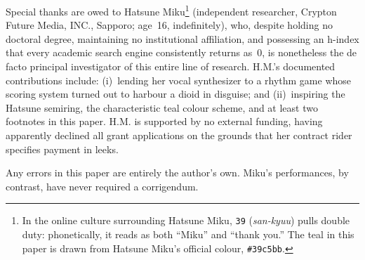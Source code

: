 \documentclass[11pt, letterpaper]{article}
\theoremstyle{definition}
\theoremstyle{remark}
\begin{document}
Special thanks are owed to Hatsune Miku\footnote{%
  In the online culture surrounding Hatsune Miku, \texttt{39} (\textit{san-kyuu}) pulls double duty: phonetically, it reads as both ``Miku'' and ``thank you.'' The teal in this paper is drawn from Hatsune Miku's official colour, \texttt{\#39c5bb}.}
(independent researcher, Crypton Future Media, INC., Sapporo; age~16, indefinitely), who, despite holding no doctoral degree, maintaining no institutional affiliation, and possessing an h-index that every academic search engine consistently returns as~0, is nonetheless the de facto principal investigator of this entire line of research.
H.M.'s documented contributions include:
(i)~lending her vocal synthesizer to a rhythm game whose scoring system turned out to harbour a dioid in disguise;
and (ii)~inspiring the Hatsune semiring, the characteristic teal colour scheme, and at least two footnotes in this paper.
H.M. is supported by no external funding, having apparently declined all grant applications on the grounds that her contract rider specifies payment in leeks.

Any errors in this paper are entirely the author's own. Miku's performances, by contrast, have never required a corrigendum.



\end{document}
